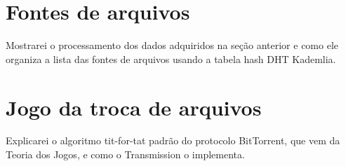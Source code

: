 
\section{Fontes de arquivos}

Mostrarei o processamento dos dados adquiridos na seção anterior e como ele organiza a lista das fontes de arquivos usando a tabela hash DHT Kademlia.

\section{Jogo da troca de arquivos}

Explicarei o algoritmo tit-for-tat padrão do protocolo BitTorrent, que vem da Teoria dos Jogos, e como o Transmission o implementa.

\afterpage{\clearpage}